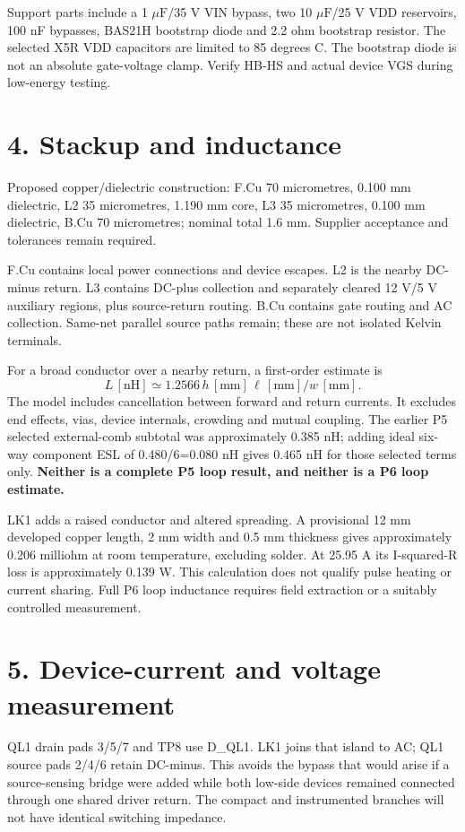 \documentclass[10pt,a4paper]{article}
\newcommand{\uF}{\ensuremath{\mu\mathrm{F}}}
\begin{document}
Support parts include a 1 \uF/35 V VIN bypass, two 10 \uF/25 V VDD reservoirs, 100 nF bypasses, BAS21H bootstrap diode and 2.2 ohm bootstrap resistor. The selected X5R VDD capacitors are limited to 85 degrees C. The bootstrap diode is not an absolute gate-voltage clamp. Verify HB-HS and actual device VGS during low-energy testing.

\section*{4. Stackup and inductance}
Proposed copper/dielectric construction: F.Cu 70 micrometres, 0.100 mm dielectric, L2 35 micrometres, 1.190 mm core, L3 35 micrometres, 0.100 mm dielectric, B.Cu 70 micrometres; nominal total 1.6 mm. Supplier acceptance and tolerances remain required.

F.Cu contains local power connections and device escapes. L2 is the nearby DC-minus return. L3 contains DC-plus collection and separately cleared 12 V/5 V auxiliary regions, plus source-return routing. B.Cu contains gate routing and AC collection. Same-net parallel source paths remain; these are not isolated Kelvin terminals.

For a broad conductor over a nearby return, a first-order estimate is
\[L\,[\mathrm{nH}]\simeq1.2566\,h\,[\mathrm{mm}]\,\ell\,[\mathrm{mm}]/w\,[\mathrm{mm}].\]
The model includes cancellation between forward and return currents. It excludes end effects, vias, device internals, crowding and mutual coupling. The earlier P5 selected external-comb subtotal was approximately 0.385 nH; adding ideal six-way component ESL of 0.480/6=0.080 nH gives 0.465 nH for those selected terms only. \textbf{Neither is a complete P5 loop result, and neither is a P6 loop estimate.}

LK1 adds a raised conductor and altered spreading. A provisional 12 mm developed copper length, 2 mm width and 0.5 mm thickness gives approximately 0.206 milliohm at room temperature, excluding solder. At 25.95 A its I-squared-R loss is approximately 0.139 W. This calculation does not qualify pulse heating or current sharing. Full P6 loop inductance requires field extraction or a suitably controlled measurement.
\newpage
\section*{5. Device-current and voltage measurement}
QL1 drain pads 3/5/7 and TP8 use D\_QL1. LK1 joins that island to AC; QL1 source pads 2/4/6 retain DC-minus. This avoids the bypass that would arise if a source-sensing bridge were added while both low-side devices remained connected through one shared driver return. The compact and instrumented branches will not have identical switching impedance.
\end{document}
